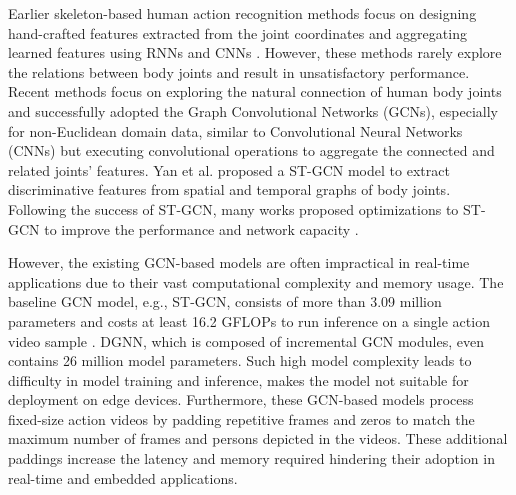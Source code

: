\documentclass[letterpaper]{article} %
\begin{document}
Earlier skeleton-based human action recognition methods focus on designing hand-crafted features extracted from the joint coordinates \cite{lie2014, actionlet2012} and aggregating learned features using RNNs and CNNs \cite{rnndu, xiememory, zhang2017view, ts3dliu, tdskrepke}. However, these methods rarely explore the relations between body joints and result in unsatisfactory performance. Recent methods focus on exploring the natural connection of human body joints and successfully adopted the Graph Convolutional Networks (GCNs), especially for non-Euclidean domain data, similar to Convolutional Neural Networks (CNNs) but executing convolutional operations to aggregate the connected and related joints' features. Yan et al. \cite{yan2018spatial} proposed a ST-GCN model to extract discriminative features from spatial and temporal graphs of body joints. Following the success of ST-GCN, many works proposed optimizations to ST-GCN to improve the performance and network capacity \cite{directed2019, Li_2019_CVPR, liu2020disentangling}.

However, the existing GCN-based models are often impractical in real-time applications due to their vast computational complexity and memory usage. The baseline GCN model, e.g., ST-GCN, consists of more than 3.09 million parameters and costs at least 16.2 GFLOPs to run inference on a single action video sample \cite{yan2018spatial}. DGNN, which is composed of incremental GCN modules, even contains 26 million model parameters. \cite{directed2019} Such high model complexity leads to difficulty in model training and inference, makes the model not suitable for deployment on edge devices. Furthermore, these GCN-based models process fixed-size action videos by padding repetitive frames and zeros to match the maximum number of frames and persons depicted in the videos. These additional paddings increase the latency and memory required hindering their adoption in real-time and embedded applications.
\end{document}
